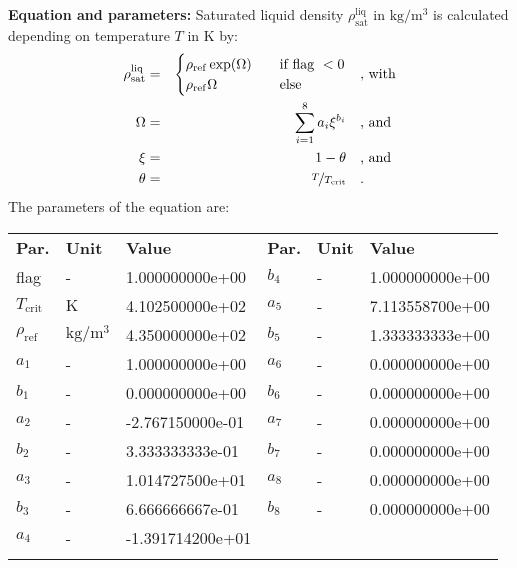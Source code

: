 \textbf{Equation and parameters:}
\newline
%
Saturated liquid density $\rho_\mathrm{sat}^\mathrm{liq}$ in $\si{\kilogram\per\cubic\meter}$ is calculated depending on temperature $T$ in $\si{\kelvin}$ by:
%
\begin{equation*}
\begin{split}
\rho_\mathrm{sat}^\mathrm{liq} &=& \begin{cases} \rho_\mathrm{ref} \exp(\Omega) & \quad \text{if flag } < 0 \\ \rho_\mathrm{ref} \Omega & \quad \text{else} \end{cases} & \quad\text{, with} \\
\Omega &=& \sum_{i=1}^{8} a_i \xi^{b_i} & \quad\text{, and} \\
\xi &=& 1 - \theta & \quad\text{, and} \\
\theta &=& \nicefrac{T}{T_\mathrm{crit}} & \quad\text{.}
\end{split}
\end{equation*}
%
The parameters of the equation are:
%
\begin{longtable}[l]{lll|lll}
\toprule
\addlinespace
\textbf{Par.} & \textbf{Unit} & \textbf{Value} &	\textbf{Par.} & \textbf{Unit} & \textbf{Value} \\
\addlinespace
\midrule
\endhead

\bottomrule
\endfoot
\bottomrule
\endlastfoot
\addlinespace

flag & - & 1.000000000e+00 & $b_4$ & - & 1.000000000e+00 \\
$T_\mathrm{crit}$ & $\si{\kelvin}$ & 4.102500000e+02 & $a_5$ & - & 7.113558700e+00 \\
$\rho_\mathrm{ref}$ & $\si{\kilogram\per\cubic\meter}$ & 4.350000000e+02 & $b_5$ & - & 1.333333333e+00 \\
$a_1$ & - & 1.000000000e+00 & $a_6$ & - & 0.000000000e+00 \\
$b_1$ & - & 0.000000000e+00 & $b_6$ & - & 0.000000000e+00 \\
$a_2$ & - & -2.767150000e-01 & $a_7$ & - & 0.000000000e+00 \\
$b_2$ & - & 3.333333333e-01 & $b_7$ & - & 0.000000000e+00 \\
$a_3$ & - & 1.014727500e+01 & $a_8$ & - & 0.000000000e+00 \\
$b_3$ & - & 6.666666667e-01 & $b_8$ & - & 0.000000000e+00 \\
$a_4$ & - & -1.391714200e+01 & & & \\

\addlinespace\end{longtable}


